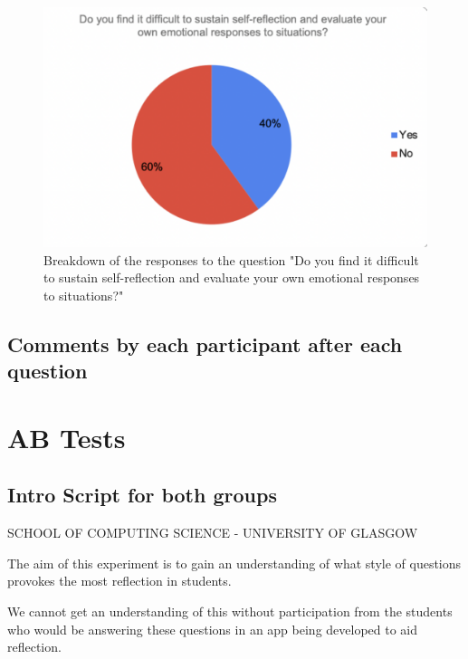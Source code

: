 \documentclass{l4proj}
\begin{document}
\begin{appendices}
\begin{figure}[H]
    \begin{centering}
    \includegraphics[scale=0.5]{images/GradAttr-8.pdf}
    \caption{Breakdown of the responses to the question "Do you find it difficult to sustain self-reflection and evaluate your own emotional responses to situations?"}
    \label{fig: GradAttr-8}
    \end{centering}
\end{figure}

\subsection{Comments by each participant after each question}



\section{AB Tests} \label{Appendix-ABTests}

\subsection{Intro Script for both groups}
SCHOOL OF COMPUTING SCIENCE - UNIVERSITY OF GLASGOW

The aim of this experiment is to gain an understanding of what style of questions provokes the most reflection in students. 

We cannot get an understanding of this without participation from the students who would be answering these questions in an app being developed to aid reflection. 


\end{appendices}
\end{document}
